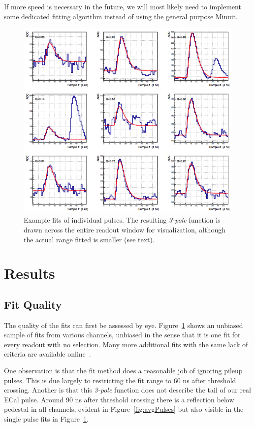 \documentclass[amsmath,amssymb,notitlepage,12pt]{revtex4-1}
\begin{document}
If more speed is necessary in the future, we will most likely need to implement some dedicated fitting algorithm instead of using the general purpose Minuit.
\begin{figure}[htbp]\centering
  \includegraphics[width=13cm]{pics/pulseFits.png}
  \caption{Example fits of individual pulses.  The resulting {\em 3-pole} function is drawn across the entire readout window for visualization, although the actual range fitted is smaller (see text).\label{fig:pulseFits}}
\end{figure}

\section{Results}
\subsection{Fit Quality}
The quality of the fits can first be assessed by eye.  Figure~\ref{fig:pulseFits} shows an unbiased sample of fits from various channels, unbiased in the sense that it is one fit for every readout with no selection.  Many more additional fits with the same lack of criteria are available online~\cite{miscfits}.

One observation is that the fit method does a reasonable job of ignoring pileup pulses.  This is due largely to restricting the fit range to 60 ns after threshold crossing.
Another is that this {\em 3-pole} function does not describe the tail of our real ECal pulse.  Around 90 ns after threshold crossing there is a reflection below pedestal in all channels, evident in Figure~\ref{fig:avgPulses} but also visible in the single pulse fits in Figure~\ref{fig:pulseFits}.
\end{document}
